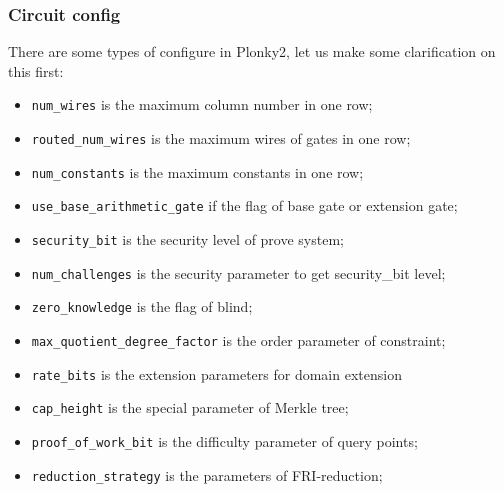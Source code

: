 \subsubsection{Circuit config} \label{sec:circuit-config}

There are some types of configure in Plonky2, let us make some clarification on this first:
\begin{itemize}
    \item \verb|num_wires| is the maximum column number in one row;
    \item \verb|routed_num_wires| is the maximum wires of gates in one row;
    \item \verb|num_constants| is the maximum constants in one row; 
    \item \verb|use_base_arithmetic_gate| if the flag of base gate or extension gate;
    \item \verb|security_bit| is the security level of prove system;
    \item \verb|num_challenges| is the security parameter to get security\_bit level;
    \item \verb|zero_knowledge| is the flag of blind;
    \item \verb|max_quotient_degree_factor| is the order parameter of constraint; 
    \item \verb|rate_bits| is the extension parameters for domain extension
    \item \verb|cap_height| is the special parameter of Merkle tree;
    \item \verb|proof_of_work_bit| is the difficulty parameter of query points;
    \item \verb|reduction_strategy| is the parameters of FRI-reduction;
\end{itemize}  


  
  
 
